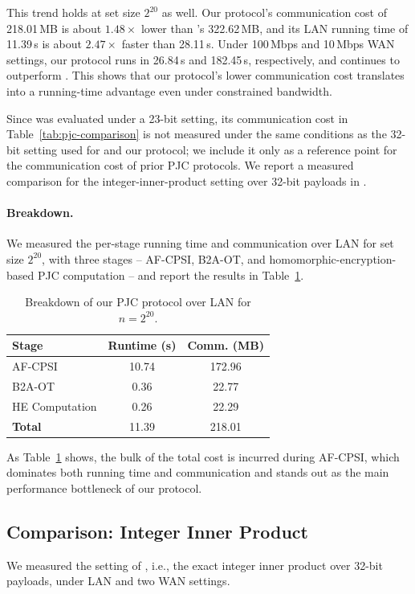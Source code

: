 This trend holds at set size $2^{20}$ as well. Our protocol's
communication cost of 218.01\,MB is about $1.48\times$ lower than
\cite{KLS26}'s 322.62\,MB, and its LAN running time of 11.39\,s is about
$2.47\times$ faster than 28.11\,s. Under 100\,Mbps and 10\,Mbps WAN
settings, our protocol runs in 26.84\,s and 182.45\,s, respectively, and
continues to outperform \cite{KLS26}. This shows that our protocol's
lower communication cost translates into a running-time advantage even
under constrained bandwidth.
 
Since \cite{CHI+23} was evaluated under a 23-bit setting, its
communication cost in Table~\ref{tab:pjc-comparison} is not measured
under the same conditions as the 32-bit setting used for \cite{KLS26}
and our protocol; we include it only as a reference point for the
communication cost of prior PJC protocols. We report a measured
comparison for the integer-inner-product setting over 32-bit payloads in
.


\paragraph{Breakdown.}

We measured the per-stage running time and communication
over LAN for set size $2^{20}$, with three stages
-- AF-CPSI, B2A-OT, and homomorphic-encryption-based PJC computation --
and report the results in Table~\ref{tab:pjc-breakdown}.

\begin{table}[!htbp]
\centering
\caption{Breakdown of our PJC protocol over LAN for $n=2^{20}$.}
\label{tab:pjc-breakdown}
\begin{tabular}{lcc}
\toprule
\textbf{Stage}
&
\textbf{Runtime (s)}
&
\textbf{Comm. (MB)}
\\
\midrule
AF-CPSI&10.74&172.96\\
B2A-OT&0.36&22.77\\
HE Computation&0.26&22.29\\
\midrule
\textbf{Total}&11.39&218.01\\
\bottomrule
\end{tabular}
\end{table}

As Table~\ref{tab:pjc-breakdown} shows, the bulk of the total cost is
incurred during AF-CPSI, which dominates both running time and
communication and stands out as the main performance bottleneck of our
protocol. 

\subsection{Comparison: Integer Inner Product}
\label{sec:integer-ip-exp}
We measured the setting of , i.e., the exact integer
inner product over 32-bit payloads, under LAN and two WAN settings.
 
